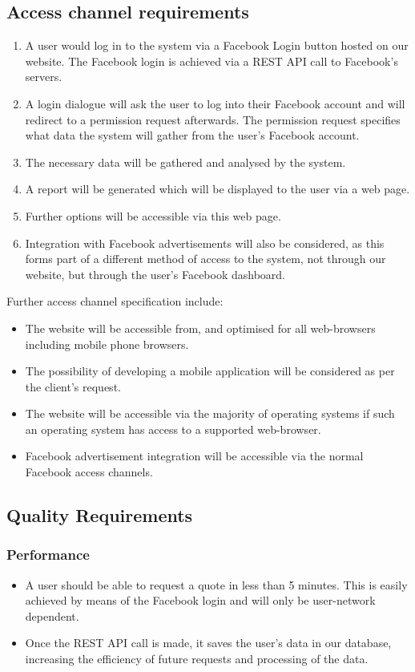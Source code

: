 \documentclass{article}
\begin{document}
	\subsection{Access channel requirements}
	\begin{enumerate}
		\item A user would log in to the system via a Facebook Login button hosted on our website. The Facebook login is achieved via a REST API call to Facebook's servers.
		\item A login dialogue will ask the user to log into their Facebook account and will redirect to a permission request afterwards. The permission request specifies what data the system will gather from the user's Facebook account.
		\item The necessary data will be gathered and analysed by the system.
		\item A report will be generated which will be displayed to the user via a web page.
		\item Further options will be accessible via this web page. 
		\item Integration with Facebook advertisements will also be considered, as this forms part of a different method of access to the system, not through our website, but through the user's Facebook dashboard.
	\end{enumerate}
	Further access channel specification include:
	\begin{itemize}
		\item The website will be accessible from, and optimised for all web-browsers including mobile phone browsers.
		\item The possibility of developing a mobile application will be considered as per the client's request.
		\item The website will be accessible via the majority of operating systems if such an operating system has access to a supported web-browser.
		\item Facebook advertisement integration will be accessible via the normal Facebook access channels.
	\end{itemize}
	 
	
	\subsection{Quality Requirements}
		\subsubsection{Performance}
		\begin{itemize}
			\item A user should be able to request a quote in less than 5 minutes. This is easily achieved by means of the Facebook login and will only be user-network dependent.
			\item Once the REST API call is made, it saves the user's data in our database, increasing the efficiency of future requests and processing of the data.
		\end{itemize}
		 
\end{document}

